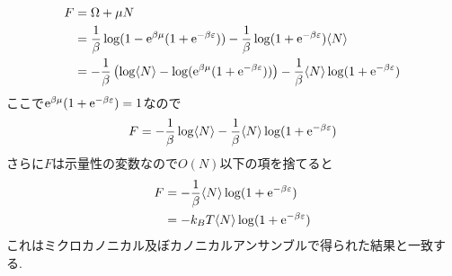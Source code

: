 \begin{align}
  \begin{split}
    F&=\Omega+\mu N\\
    &=\frac{1}{\beta}\log(1-{\rm e}^{\beta\mu}(1+{\rm e}^{-\beta\varepsilon}))-\frac{1}{\beta}\log(1+{\rm e}^{-\beta\varepsilon})\langle N\rangle\\
    &=-\frac{1}{\beta}\left(\log\langle N\rangle-\log({\rm e}^{\beta\mu}(1+{\rm e}^{-\beta\varepsilon}))\right)-\frac{1}{\beta}\langle N\rangle\log(1+{\rm e}^{-\beta\varepsilon})\\
  \end{split}
\end{align}
ここで${\rm e}^{\beta\mu}(1+{\rm e}^{-\beta\varepsilon})=1$なので
\begin{align}
  F=-\frac{1}{\beta}\log\langle N\rangle-\frac{1}{\beta}\langle N\rangle\log(1+{\rm e}^{-\beta\varepsilon})
\end{align}
さらに$F$は示量性の変数なので$O(N)$以下の項を捨てると
\begin{align}
  F&=-\frac{1}{\beta}\langle N\rangle\log(1+{\rm e}^{-\beta\varepsilon})\\
  &=-k_BT\langle N\rangle\log(1+{\rm e}^{-\beta\varepsilon})
\end{align}
これはミクロカノニカル及ぼカノニカルアンサンブルで得られた結果と一致する.
